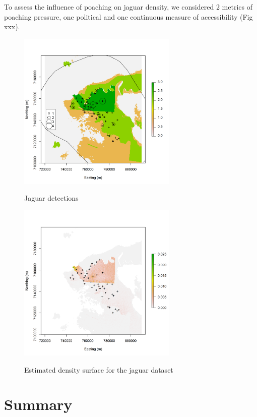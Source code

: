 To assess the influence of poaching on jaguar density, we considered 2
metrics of poaching pressure, one political and one continuous measure
of accessibility (Fig xxx).









\begin{figure}
\centering
\includegraphics[width=3in,height=3in]{figs/jaguarCountMap}
\label{ch9:fig:jaguarCts}
\caption{Jaguar detections}
\end{figure}




\begin{figure}
\centering
\includegraphics[width=3in,height=3in]{figs/Dsurface34}
\label{ch9:fig:Dsurface}
\caption{Estimated density surface for the jaguar dataset}
\end{figure}




\section{Summary}

